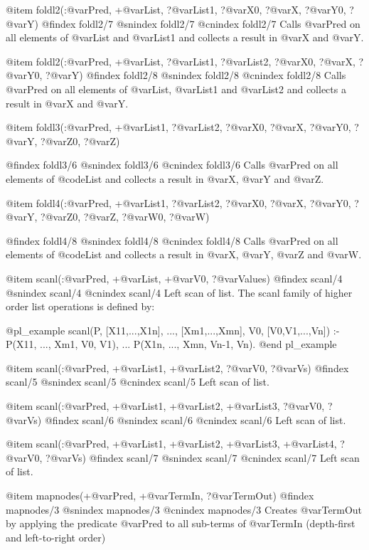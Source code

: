 @item foldl2(:@var{Pred}, +@var{List}, ?@var{List1}, ?@var{X0}, ?@var{X}, ?@var{Y0}, ?@var{Y})
@findex foldl2/7
@snindex foldl2/7
@cnindex foldl2/7
      Calls @var{Pred} on all elements of @var{List}  and @var{List1}  and collects a result in
@var{X} and @var{Y}.

@item foldl2(:@var{Pred}, +@var{List}, ?@var{List1}, ?@var{List2}, ?@var{X0}, ?@var{X}, ?@var{Y0}, ?@var{Y})
@findex foldl2/8
@snindex foldl2/8
@cnindex foldl2/8
      Calls @var{Pred} on all elements of @var{List}, @var{List1}  and @var{List2}  and collects a result in
@var{X} and @var{Y}.

@item foldl3(:@var{Pred}, +@var{List1}, ?@var{List2}, ?@var{X0}, ?@var{X}, ?@var{Y0}, ?@var{Y}, ?@var{Z0}, ?@var{Z})

@findex foldl3/6
@snindex foldl3/6
@cnindex foldl3/6
      Calls @var{Pred} on all elements of @code{List} and collects a
result in @var{X}, @var{Y} and @var{Z}.

@item foldl4(:@var{Pred}, +@var{List1}, ?@var{List2}, ?@var{X0}, ?@var{X}, ?@var{Y0}, ?@var{Y}, ?@var{Z0}, ?@var{Z}, ?@var{W0}, ?@var{W})

@findex foldl4/8
@snindex foldl4/8
@cnindex foldl4/8
      Calls @var{Pred} on all elements of @code{List} and collects a
result in @var{X}, @var{Y}, @var{Z} and @var{W}.

@item scanl(:@var{Pred}, +@var{List}, +@var{V0}, ?@var{Values})
@findex scanl/4
@snindex scanl/4
@cnindex scanl/4
         Left scan of  list.  The  scanl   family  of  higher  order list
    operations is defined by:

@pl_example
      scanl(P, [X11,...,X1n], ..., [Xm1,...,Xmn], V0, [V0,V1,...,Vn]) :-
        P(X11, ..., Xm1, V0, V1),
        ...
            P(X1n, ..., Xmn, Vn-1, Vn).
@end pl_example


@item scanl(:@var{Pred}, +@var{List1}, +@var{List2}, ?@var{V0}, ?@var{Vs})
@findex scanl/5
@snindex scanl/5
@cnindex scanl/5
         Left scan of  list.  

@item scanl(:@var{Pred}, +@var{List1}, +@var{List2}, +@var{List3}, ?@var{V0}, ?@var{Vs})
@findex scanl/6
@snindex scanl/6
@cnindex scanl/6
         Left scan of  list.  

@item scanl(:@var{Pred}, +@var{List1}, +@var{List2}, +@var{List3}, +@var{List4}, ?@var{V0}, ?@var{Vs})
@findex scanl/7
@snindex scanl/7
@cnindex scanl/7
         Left scan of  list.  

@item mapnodes(+@var{Pred}, +@var{TermIn}, ?@var{TermOut}) 
@findex mapnodes/3
@snindex mapnodes/3
@cnindex mapnodes/3
      Creates @var{TermOut} by applying the predicate @var{Pred}
      to all sub-terms of @var{TermIn} (depth-first and left-to-right order)

